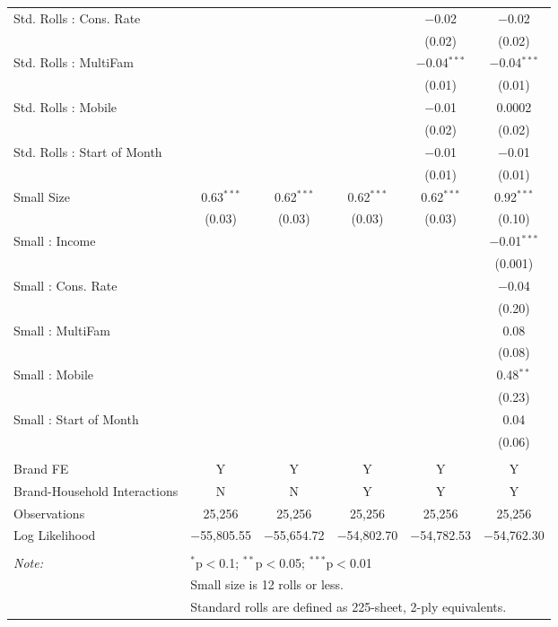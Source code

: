 \begin{table}[!htbp]
\begin{tabular}{@{\extracolsep{5pt}}lccccc}
  Std. Rolls : Cons. Rate &  &  &  & $-$0.02 & $-$0.02 \\ 
  &  &  &  & (0.02) & (0.02) \\ 
  Std. Rolls : MultiFam &  &  &  & $-$0.04$^{***}$ & $-$0.04$^{***}$ \\ 
  &  &  &  & (0.01) & (0.01) \\ 
  Std. Rolls : Mobile &  &  &  & $-$0.01 & 0.0002 \\ 
  &  &  &  & (0.02) & (0.02) \\ 
  Std. Rolls : Start of Month &  &  &  & $-$0.01 & $-$0.01 \\ 
  &  &  &  & (0.01) & (0.01) \\ 
  Small Size & 0.63$^{***}$ & 0.62$^{***}$ & 0.62$^{***}$ & 0.62$^{***}$ & 0.92$^{***}$ \\ 
  & (0.03) & (0.03) & (0.03) & (0.03) & (0.10) \\ 
  Small : Income &  &  &  &  & $-$0.01$^{***}$ \\ 
  &  &  &  &  & (0.001) \\ 
  Small : Cons. Rate &  &  &  &  & $-$0.04 \\ 
  &  &  &  &  & (0.20) \\ 
  Small : MultiFam &  &  &  &  & 0.08 \\ 
  &  &  &  &  & (0.08) \\ 
  Small : Mobile &  &  &  &  & 0.48$^{**}$ \\ 
  &  &  &  &  & (0.23) \\ 
  Small : Start of Month &  &  &  &  & 0.04 \\ 
  &  &  &  &  & (0.06) \\ 
 \hline \\[-1.8ex] 
Brand FE & Y & Y & Y & Y & Y \\ 
Brand-Household Interactions & N & N & Y & Y & Y \\ 
Observations & 25,256 & 25,256 & 25,256 & 25,256 & 25,256 \\ 
Log Likelihood & $-$55,805.55 & $-$55,654.72 & $-$54,802.70 & $-$54,782.53 & $-$54,762.30 \\ 
\hline 
\hline \\[-1.8ex] 
\textit{Note:}  & \multicolumn{5}{l}{$^{*}$p$<$0.1; $^{**}$p$<$0.05; $^{***}$p$<$0.01} \\ 
 & \multicolumn{5}{l}{Small size is 12 rolls or less.} \\ 
 & \multicolumn{5}{l}{Standard rolls are defined as 225-sheet, 2-ply equivalents.} \\ 
\end{tabular} 
\end{table} 
